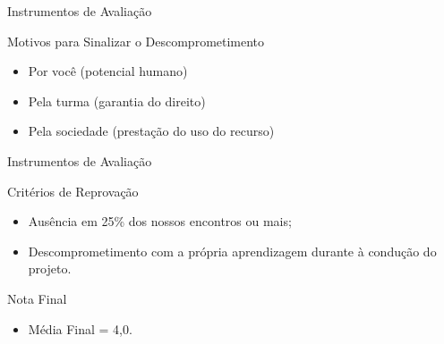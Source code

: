 \documentclass[xcolor=dvipsnames,table]{beamer}
\begin{document}
\begin{frame}{Instrumentos de Avaliação}
    \begin{block}{Motivos para Sinalizar o Descomprometimento}
        \begin{itemize}
            \item Por você (potencial humano)
            \item Pela turma (garantia do direito)
            \item Pela sociedade (prestação do uso do recurso)
        \end{itemize}
    \end{block}
\end{frame}

\begin{frame}{Instrumentos de Avaliação}
    \begin{alertblock}{Critérios de Reprovação}
        \begin{itemize}
            \item Ausência em 25\% dos nossos encontros ou mais;
            \item Descomprometimento com a própria aprendizagem durante à condução do projeto.
        \end{itemize}
    \end{alertblock} \pause
    \begin{block}{Nota Final}
        \begin{itemize}
            \item Média Final = 4,0.
        \end{itemize}
        
    \end{block}
\end{frame}

	
\end{document}
